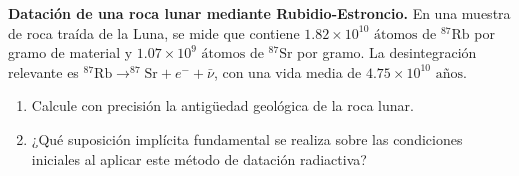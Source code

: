 \item \textbf{Datación de una roca lunar mediante Rubidio-Estroncio.}
En una muestra de roca traída de la Luna, se mide que contiene $1.82 \times 10^{10}\text{ átomos}$ de $^{87}\text{Rb}$ por gramo de material y $1.07 \times 10^9\text{ átomos}$ de $^{87}\text{Sr}$ por gramo. La desintegración relevante es $^{87}\text{Rb} \to ^{87}\text{Sr} + e^- + \bar{\nu}$, con una vida media de $4.75 \times 10^{10}\text{ años}$.
\begin{enumerate}
    \item Calcule con precisión la antigüedad geológica de la roca lunar.
    \item ¿Qué suposición implícita fundamental se realiza sobre las condiciones iniciales al aplicar este método de datación radiactiva?
\end{enumerate}